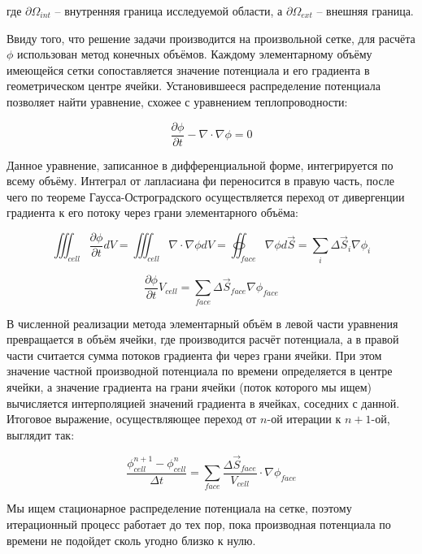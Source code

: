 \documentclass[a4paper,12pt]{article}
\begin{document}
\noindent
где $\partial \Omega_{int}$ -- внутренняя граница исследуемой области, а $\partial \Omega_{ext}$ -- внешняя граница.

Ввиду того, что решение задачи производится на произвольной сетке, для расчёта $\phi$ использован метод конечных объёмов. Каждому элементарному объёму имеющейся сетки сопоставляется значение потенциала и его градиента в геометрическом центре ячейки. Установившееся распределение потенциала позволяет найти уравнение, схожее с уравнением теплопроводности:

\begin{equation}
    \frac{\partial \phi}{\partial t} - \nabla \cdot \nabla \phi = 0
\end{equation}

Данное уравнение, записанное в дифференциальной форме, интегрируется по всему объёму. Интеграл от лапласиана фи переносится в правую часть, после чего по теореме Гаусса-Остроградского осуществляется переход от дивергенции градиента к его потоку через грани элементарного объёма:

\begin{equation}
    \iiint_{cell} \frac{\partial \phi}{\partial t} dV = \iiint_{cell} \nabla \cdot \nabla \phi dV = \oiint_{face} \nabla \phi d \vec S = \sum_i \Delta \vec S_i \nabla \phi_i
\end{equation}

\begin{equation}
    \frac{\partial \phi}{\partial t} V_{cell} = \sum_{face} \Delta \vec S_{face} \nabla \phi_{face}
\end{equation}

В численной реализации метода элементарный объём в левой части уравнения превращается в объём ячейки, где производится расчёт потенциала, а в правой части считается сумма потоков градиента фи через грани ячейки. При этом значение частной производной потенциала по времени определяется в центре ячейки, а значение градиента на грани ячейки (поток которого мы ищем) вычисляется интерполяцией значений градиента в ячейках, соседних с данной.
Итоговое выражение, осуществляющее переход от $n$-ой итерации к $n+1$-ой, выглядит так:

\begin{equation}
    \frac{\phi_{cell}^{n+1} - \phi_{cell}^{n}}{\Delta t} = \sum_{face} \frac{\Delta \vec S_{face}}{V_{cell}} \cdot \nabla \phi_{face}
\end{equation}

Мы ищем стационарное распределение потенциала на сетке, поэтому итерационный процесс работает до тех пор, пока производная потенциала по времени не подойдет сколь угодно близко к нулю.
\end{document}
